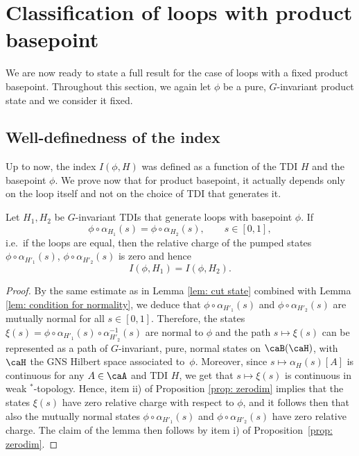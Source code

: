 \section{Classification of loops with product basepoint} \label{sec: classification for product loops}

We are now ready to state a full result for the case of loops with a fixed product basepoint. Throughout this section, we again let $\phi$ be a pure, $G$-invariant product state and we consider it fixed. 



\subsection{Well-definedness of the index}
Up to now, the index $I(\phi,H)$ was defined as a function of the TDI $H$ and the basepoint $\phi$. We prove now that for product basepoint, it actually depends only on the loop itself and not on the choice of TDI that generates it. 
\begin{lemma}\label{lem: index indep of h}
	Let $H_1,H_2$ be $G$-invariant TDIs that generate loops with basepoint $\phi$. If
	$$\phi\circ\alpha_{H_1}(s)=\phi\circ\alpha_{H_2}(s), \qquad s\in [0,1], $$ i.e.\ if the loops are equal, then the relative charge of the pumped states  $\phi\circ\alpha_{H'_1}(s)$, $\phi\circ\alpha_{H'_2}(s)$ is zero and hence 
	$$
	I(\phi,H_1)=I(\phi,H_2).
	$$ 
\end{lemma}
\begin{proof}
	By the same estimate as in Lemma \ref{lem: cut state} combined with Lemma \ref{lem: condition for normality}, we deduce that  $\phi\circ\alpha_{H'_1}(s)$ and $\phi\circ\alpha_{H'_2}(s)$ are mutually normal for all $s\in [0,1]$.  Therefore, the states $\xi(s)=\phi\circ\alpha_{H'_1}(s) \circ \alpha^{-1}_{H'_2}(s) $ are normal to $\phi$ and the path $s\mapsto \xi(s)$ can be represented as a path of $G$-invariant, pure, normal states on $\caB(\caH)$, with $\caH$ the GNS Hilbert space associated to~$\phi$.  Moreover, since $s\mapsto \alpha_H(s)[A]$ is continuous for any $A\in\caA$ and TDI $H$, we get that 
	$s\mapsto \xi(s)$ is continuous in weak $^*$-topology. Hence, item ii) of Proposition \ref{prop: zerodim} implies that the states $\xi(s)$ have zero relative charge with respect to $\phi$, and it follows then that also the mutually normal states 
	$\phi\circ\alpha_{H'_1}(s)$ and $\phi\circ\alpha_{H'_2}(s)$ have zero relative charge.  
	The claim of the lemma then follows by item i) of Proposition~\ref{prop: zerodim}.
\end{proof} 

